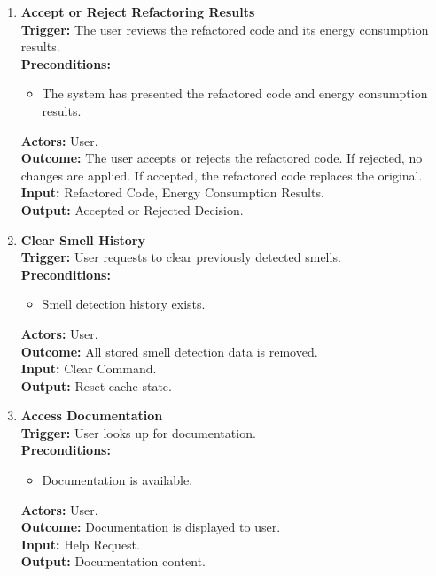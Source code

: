 \documentclass[12pt]{article}
\begin{document}
\begin{enumerate}[label={\bf PUC \arabic*:}, wide=0pt, font=\itshape]
  \item \textbf{Accept or Reject Refactoring Results} \\[2mm]
    \textbf{Trigger:} The user reviews the refactored code and its energy consumption results. \\[2mm]
    \textbf{Preconditions:}
    \begin{itemize}
      \item The system has presented the refactored code and energy consumption results.
    \end{itemize}
    \textbf{Actors:} User. \\
    \textbf{Outcome:} The user accepts or rejects the refactored code. If rejected, no changes are applied. If accepted, the refactored code replaces the original. \\
    \textbf{Input:} Refactored Code, Energy Consumption Results. \\
    \textbf{Output:} Accepted or Rejected Decision.

  \item \textbf{Clear Smell History} \\[2mm]
    \textbf{Trigger:} User requests to clear previously detected smells. \\[2mm]
    \textbf{Preconditions:}
    \begin{itemize}
      \item Smell detection history exists.
    \end{itemize}
    \textbf{Actors:} User. \\
    \textbf{Outcome:} All stored smell detection data is removed. \\
    \textbf{Input:} Clear Command. \\
    \textbf{Output:} Reset cache state.

  \item \textbf{Access Documentation} \\[2mm]
    \textbf{Trigger:} User looks up for documentation. \\[2mm]
    \textbf{Preconditions:}
    \begin{itemize}
      \item Documentation is available.
    \end{itemize}
    \textbf{Actors:} User. \\
    \textbf{Outcome:} Documentation is displayed to user. \\
    \textbf{Input:} Help Request. \\
    \textbf{Output:} Documentation content.


\end{enumerate}
\end{document}
